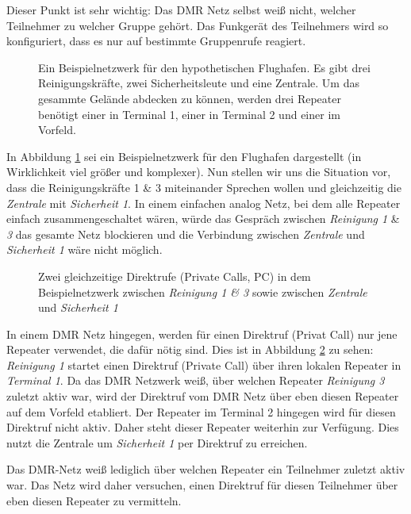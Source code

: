 \begin{merke}
 Dieser Punkt ist sehr wichtig: Das DMR Netz selbst weiß nicht, welcher Teilnehmer zu welcher Gruppe gehört. Das Funkgerät des Teilnehmers wird so konfiguriert, dass es nur auf bestimmte Gruppenrufe reagiert.
\end{merke}

\begin{figure}[!ht]
 \centering
 
 \caption{Ein Beispielnetzwerk für den hypothetischen Flughafen. Es gibt drei Reinigungskräfte, zwei Sicherheitsleute und eine Zentrale. Um das gesammte Gelände abdecken zu können, werden drei Repeater benötigt einer in Terminal 1, einer in Terminal 2 und einer im Vorfeld.} \label{fig:exnet1}
\end{figure}

In Abbildung \ref{fig:exnet1} sei ein Beispielnetzwerk für den Flughafen dargestellt (in Wirklichkeit viel größer und komplexer). Nun stellen wir uns die Situation vor, dass die Reinigungskräfte 1 \& 3 miteinander Sprechen wollen und gleichzeitig die \emph{Zentrale} mit \emph{Sicherheit 1}. In einem einfachen analog Netz, bei dem alle Repeater einfach zusammengeschaltet wären, würde das Gespräch zwischen \emph{Reinigung 1} \& \emph{3} das gesamte Netz blockieren und die Verbindung zwischen \emph{Zentrale} und \emph{Sicherheit 1} wäre nicht möglich. 

\begin{figure}[!ht]
 \centering
 
 \caption{Zwei gleichzeitige Direktrufe (Private Calls, PC) in dem Beispielnetzwerk zwischen \emph{Reinigung 1 \& 3} sowie zwischen \emph{Zentrale} und \emph{Sicherheit 1}} \label{fig:exnet2}
\end{figure}

In einem DMR Netz hingegen, werden für einen Direktruf (Privat Call) nur jene Repeater verwendet, die dafür nötig sind. Dies ist in Abbildung \ref{fig:exnet2} zu sehen: \emph{Reinigung 1} startet einen Direktruf (Private Call) über ihren lokalen Repeater in \emph{Terminal 1}. Da das DMR Netzwerk weiß, über welchen Repeater \emph{Reinigung 3} zuletzt aktiv war, wird der Direktruf vom DMR Netz über eben diesen Repeater auf dem Vorfeld etabliert. Der Repeater im Terminal 2 hingegen wird für diesen Direktruf nicht aktiv. Daher steht dieser Repeater weiterhin zur Verfügung. Dies nutzt die Zentrale um \emph{Sicherheit 1} per Direktruf zu erreichen. 

\begin{merke}
Das DMR-Netz weiß lediglich über welchen Repeater ein Teilnehmer zuletzt aktiv war. Das Netz wird daher versuchen, einen Direktruf für diesen Teilnehmer über eben diesen Repeater zu vermitteln.
\end{merke}

